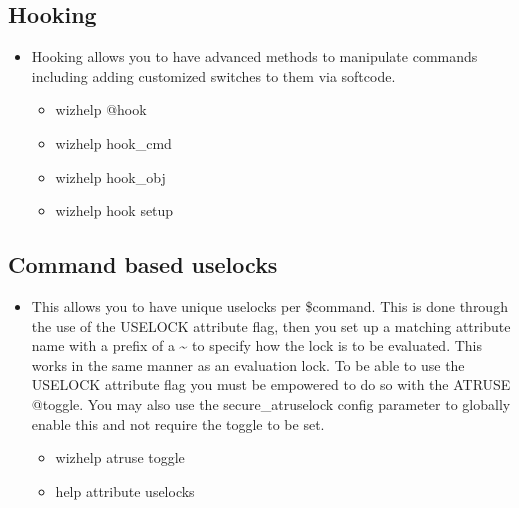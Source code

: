\documentclass[letterpaper,10pt,english]{sphinxmanual}
\begin{document}
\subsection{Hooking}
\label{\detokenize{features:hooking}}\begin{itemize}
\item {} 
\sphinxAtStartPar
Hooking allows you to have advanced methods to manipulate commands
including adding customized switches to them via softcode.
\begin{itemize}
\item {} 
\sphinxAtStartPar
wizhelp @hook

\item {} 
\sphinxAtStartPar
wizhelp hook\_cmd

\item {} 
\sphinxAtStartPar
wizhelp hook\_obj

\item {} 
\sphinxAtStartPar
wizhelp hook setup

\end{itemize}

\end{itemize}


\subsection{Command based uselocks}
\label{\detokenize{features:command-based-uselocks}}\begin{itemize}
\item {} 
\sphinxAtStartPar
This allows you to have unique uselocks per \$command.  This is done
through the use of the USELOCK attribute flag, then you set up
a matching attribute name with a prefix of a \textasciitilde{} to specify how
the lock is to be evaluated.  This works in the same manner
as an evaluation lock.  To be able to use the USELOCK attribute flag
you must be empowered to do so with the \textquotesingle{}ATRUSE\textquotesingle{} @toggle.  You may
also use the secure\_atruselock config parameter to globally enable
this and not require the toggle to be set.
\begin{itemize}
\item {} 
\sphinxAtStartPar
wizhelp atruse toggle

\item {} 
\sphinxAtStartPar
help attribute uselocks

\end{itemize}

\end{itemize}
\end{document}
